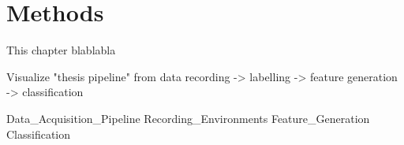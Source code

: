 \chapter{Methods} \label{ch:methods}

This chapter blablabla

Visualize "thesis pipeline" from data recording -> labelling -> feature generation -> classification

{Data_Acquisition_Pipeline}
{Recording_Environments}
{Feature_Generation}
{Classification}